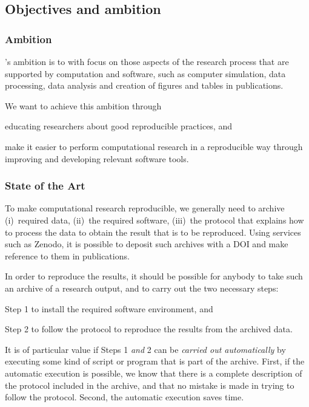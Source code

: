 \subsection{Objectives and ambition}

\subsubsection{Ambition}

\TheProject's ambition is to  with focus on those aspects of the research process that
are supported by computation and software, such as computer simulation, data
processing, data analysis and creation of figures and tables in publications.

We want to achieve this ambition through
\begin{compactitem}
\item educating researchers about good reproducible practices, and
\item make it easier to perform computational research in a reproducible way
  through improving and developing relevant software tools.
\end{compactitem}

\subsubsection{State of the Art}

To make computational research reproducible, we generally need to archive
(i)~required data, (ii)~the required software, (iii)~the protocol that explains
how to process the data to obtain the result that is to be reproduced. Using
services such as Zenodo, it is possible to deposit such archives with a DOI and
make reference to them in publications.

In order to reproduce the results, it should be possible for anybody to take such an archive of a research
output, and to carry out the two necessary steps:
\begin{compactitem}
\item Step 1 to install the required software environment, and
\item Step 2 to follow the protocol to reproduce the results from the archived data.
\end{compactitem}

It is of particular value if Steps 1 \emph{and} 2 can be \emph{carried out
  automatically} by executing some kind of script or program that is part of the
archive. First, if the automatic execution is possible, we know that there is a
complete description of the protocol included in the archive, and that no
mistake is made in trying to follow the protocol. Second, the automatic
execution saves time.

